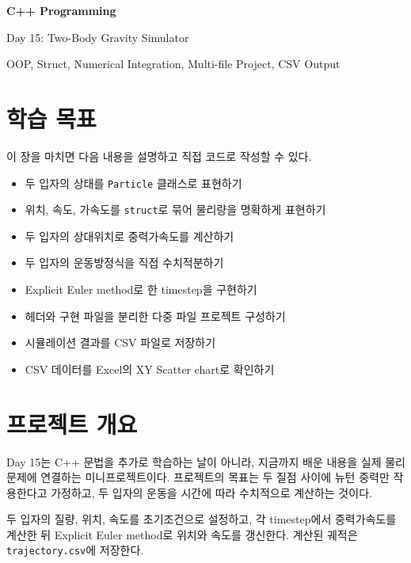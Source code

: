 \documentclass[11pt,a4paper]{article}
\begin{document}
\begin{titlepage}
    \centering
    \vspace*{3cm}
    {\Huge\bfseries C++ Programming\par}
    \vspace{0.8cm}
    {\LARGE Day 15: Two-Body Gravity Simulator\par}
    \vspace{2cm}
    {\large OOP, Struct, Numerical Integration, Multi-file Project, CSV Output\par}
    \vfill
\end{titlepage}

\tableofcontents
\newpage

\section{학습 목표}
\begin{learningbox}
이 장을 마치면 다음 내용을 설명하고 직접 코드로 작성할 수 있다.
\begin{itemize}[leftmargin=1.5em]
    \item 두 입자의 상태를 \texttt{Particle} 클래스로 표현하기
    \item 위치, 속도, 가속도를 \texttt{struct}로 묶어 물리량을 명확하게 표현하기
    \item 두 입자의 상대위치로 중력가속도를 계산하기
    \item 두 입자의 운동방정식을 직접 수치적분하기
    \item Explicit Euler method로 한 timestep을 구현하기
    \item 헤더와 구현 파일을 분리한 다중 파일 프로젝트 구성하기
    \item 시뮬레이션 결과를 CSV 파일로 저장하기
    \item CSV 데이터를 Excel의 XY Scatter chart로 확인하기
\end{itemize}
\end{learningbox}

\section{프로젝트 개요}
Day 15는 C++ 문법을 추가로 학습하는 날이 아니라, 지금까지 배운 내용을 실제 물리 문제에 연결하는 미니프로젝트이다.
프로젝트의 목표는 두 질점 사이에 뉴턴 중력만 작용한다고 가정하고, 두 입자의 운동을 시간에 따라 수치적으로 계산하는 것이다.

\begin{practicebox}
두 입자의 질량, 위치, 속도를 초기조건으로 설정하고, 각 timestep에서 중력가속도를 계산한 뒤 Explicit Euler method로 위치와 속도를 갱신한다. 계산된 궤적은 \texttt{trajectory.csv}에 저장한다.
\end{practicebox}
\end{document}
